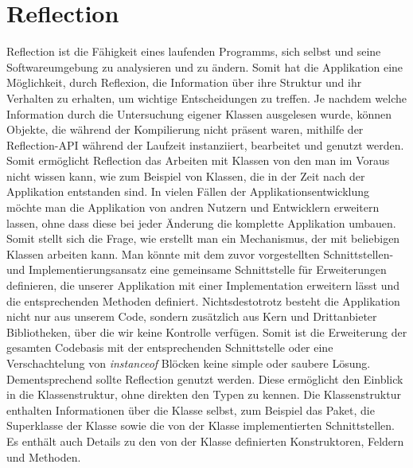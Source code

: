 \section{Reflection}\label{sec:refl}
  Reflection ist die Fähigkeit eines laufenden Programms, sich selbst und seine Softwareumgebung zu analysieren und zu ändern. 
  Somit hat die Applikation eine Möglichkeit, durch Reflexion, die Information über ihre Struktur und ihr Verhalten zu erhalten, um wichtige Entscheidungen zu treffen. Je nachdem welche Information durch die Untersuchung eigener Klassen ausgelesen wurde, können Objekte, die während der Kompilierung nicht präsent waren, mithilfe der Reflection-API während der Laufzeit instanziiert, bearbeitet und genutzt werden. Somit ermöglicht Reflection das Arbeiten mit Klassen von den man im Voraus nicht wissen kann, wie zum Beispiel von Klassen, die in der Zeit nach der Applikation entstanden sind.\bigbreak 
  In vielen Fällen der Applikationsentwicklung möchte man die Applikation von andren Nutzern und Entwicklern erweitern lassen, ohne dass diese bei jeder Änderung die komplette Applikation umbauen. Somit stellt sich die Frage, wie erstellt man ein Mechanismus, der mit beliebigen Klassen arbeiten kann.\newline
  Man könnte mit dem zuvor vorgestellten Schnittstellen- und Implementierungsansatz eine gemeinsame Schnittstelle für Erweiterungen definieren, die unserer Applikation mit einer Implementation erweitern lässt und die entsprechenden Methoden definiert. Nichtsdestotrotz besteht die Applikation nicht nur aus unserem Code, sondern zusätzlich aus Kern und Drittanbieter Bibliotheken, über die wir keine Kontrolle verfügen. Somit ist die Erweiterung der gesamten Codebasis mit der entsprechenden Schnittstelle oder eine Verschachtelung von \textit{instanceof} Blöcken keine simple oder saubere Lösung. Dementsprechend sollte Reflection genutzt werden. Diese ermöglicht den Einblick in die Klassenstruktur, ohne direkten den Typen zu kennen. Die Klassenstruktur enthalten Informationen über die Klasse selbst, zum Beispiel das Paket, die Superklasse der Klasse sowie die von der Klasse implementierten Schnittstellen. Es enthält auch Details zu den von der Klasse definierten Konstruktoren, Feldern und Methoden.\bigbreak

